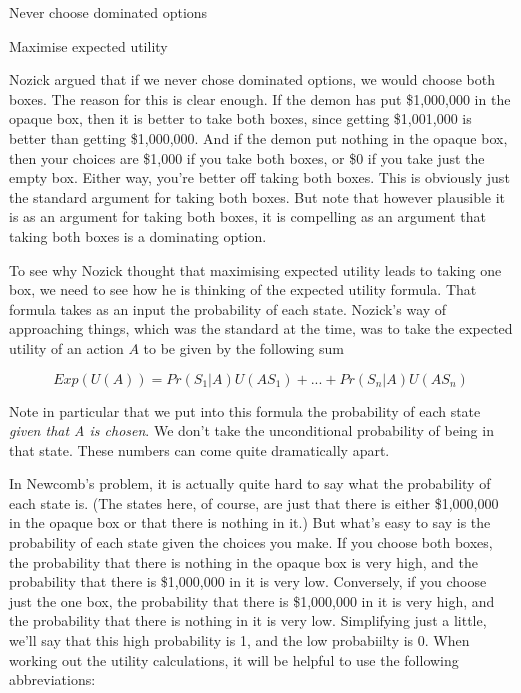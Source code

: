 \begin{itemize*}
\item Never choose dominated options
\item Maximise expected utility
\end{itemize*}

Nozick argued that if we never chose dominated options, we would choose both boxes. The reason for this is clear enough. If the demon has put \$1,000,000 in the opaque box, then it is better to take both boxes, since getting \$1,001,000 is better than getting \$1,000,000. And if the demon put nothing in the opaque box, then your choices are \$1,000 if you take both boxes, or \$0 if you take just the empty box. Either way, you're better off taking both boxes. This is obviously just the standard argument for taking both boxes. But note that however plausible it is as an argument for taking both boxes, it is compelling as an argument that taking both boxes is a dominating option.

To see why Nozick thought that maximising expected utility leads to taking one box, we need to see how he is thinking of the expected utility formula. That formula takes as an input the probability of each state. Nozick's way of approaching things, which was the standard at the time, was to take the expected utility of an action $A$ to be given by the following sum

\begin{equation*}
Exp(U(A)) = Pr(S_1 | A)U(AS_1) + ... + Pr(S_n | A)U(AS_n)
\end{equation*}

Note in particular that we put into this formula the probability of each state \textit{given that A is chosen}. We don't take the unconditional probability of being in that state. These numbers can come quite dramatically apart.

In Newcomb's problem, it is actually quite hard to say what the probability of each state is. (The states here, of course, are just that there is either \$1,000,000 in the opaque box or that there is nothing in it.) But what's easy to say is the probability of each state given the choices you make. If you choose both boxes, the probability that there is nothing in the opaque box is very high, and the probability that there is \$1,000,000 in it is very low. Conversely, if you choose just the one box, the probability that there is \$1,000,000 in it is very high, and the probability that there is nothing in it is very low. Simplifying just a little, we'll say that this high probability is 1, and the low probabiilty is 0. When working out the utility calculations, it will be helpful to use the following abbreviations:

